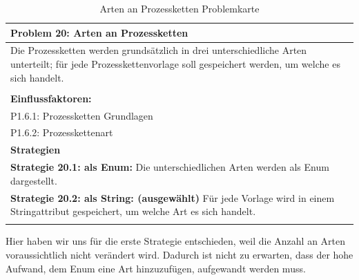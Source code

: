 \documentclass[enabledeprecatedfontcommands,fontsize=12pt,paper=a4,twoside]{scrartcl}
\begin{document}
\begin{table}[H]
    \centering
    \begin{tabular}{|p{15cm}|}
    \hline
          \textbf{Problem 20:} Arten an Prozessketten
          \\ \hline
          Die Prozessketten werden grundsätzlich in drei unterschiedliche Arten unterteilt; für jede Prozesskettenvorlage soll gespeichert werden, um welche es sich handelt. \\
          \\ \hline
          \textbf{Einflussfaktoren: } \\
         P1.6.1: Prozessketten Grundlagen\\
	P1.6.2: Prozesskettenart \\
          \hline
          \textbf{Strategien} \\ \hline
          {}          
           \label{strategie:20.1} 
	\textbf{Strategie 20.1: als Enum:} Die unterschiedlichen Arten werden als Enum dargestellt. \\
	{}          
           \label{strategie:20.2} 
	\textbf{Strategie 20.2: als String: (ausgewählt)} Für jede Vorlage wird in einem Stringattribut gespeichert, um welche Art es sich handelt. \\
          \\ \hline
    \end{tabular}
    \caption{Arten an Prozessketten Problemkarte}
    \label{tab:ProblemKarte20}
\end{table}
Hier haben wir uns für die erste Strategie entschieden, weil die Anzahl an Arten voraussichtlich nicht verändert wird. Dadurch ist nicht zu erwarten, dass der hohe Aufwand, dem Enum eine Art hinzuzufügen, aufgewandt werden muss. \\
\end{document}
